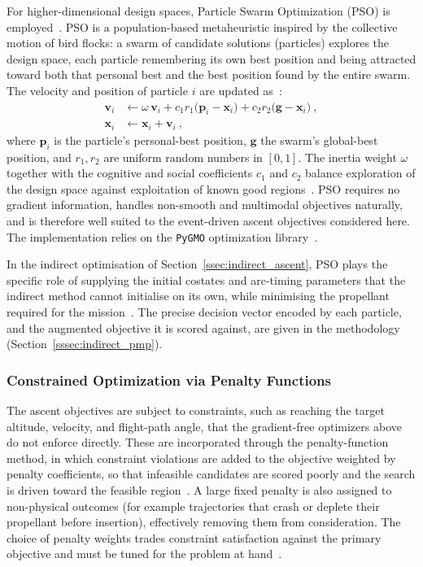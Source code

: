 For higher-dimensional design spaces, Particle Swarm Optimization (PSO) is employed~\cite{kennedy1995particle}. PSO is a population-based metaheuristic inspired by the collective motion of bird flocks: a swarm of candidate solutions (particles) explores the design space, each particle remembering its own best position and being attracted toward both that personal best and the best position found by the entire swarm. The velocity and position of particle $i$ are updated as~\cite{kennedy1995particle, shi1998modified}:
\begin{equation}
\begin{aligned}
\mathbf{v}_i &\leftarrow \omega\,\mathbf{v}_i + c_1 r_1\bigl(\mathbf{p}_i-\mathbf{x}_i\bigr) + c_2 r_2\bigl(\mathbf{g}-\mathbf{x}_i\bigr) \ ,\\
\mathbf{x}_i &\leftarrow \mathbf{x}_i + \mathbf{v}_i \ ,
\end{aligned}
\label{eq:pso_update}
\end{equation}
where $\mathbf{p}_i$ is the particle's personal-best position, $\mathbf{g}$ the swarm's global-best position, and $r_1,r_2$ are uniform random numbers in $[0,1]$. The inertia weight $\omega$ together with the cognitive and social coefficients $c_1$ and $c_2$ balance exploration of the design space against exploitation of known good regions~\cite{shi1998modified}. PSO requires no gradient information, handles non-smooth and multimodal objectives naturally, and is therefore well suited to the event-driven ascent objectives considered here. The implementation relies on the \texttt{PyGMO} optimization library~\cite{biscani2020pagmo}.

In the indirect optimisation of Section~\ref{ssec:indirect_ascent}, PSO plays the specific role of supplying the initial costates and arc-timing parameters that the indirect method cannot initialise on its own, while minimising the propellant required for the mission~\cite{pontani2014particle}. The precise decision vector encoded by each particle, and the augmented objective it is scored against, are given in the methodology (Section~\ref{sssec:indirect_pmp}).


\subsubsection{Constrained Optimization via Penalty Functions}

The ascent objectives are subject to constraints, such as reaching the target altitude, velocity, and flight-path angle, that the gradient-free optimizers above do not enforce directly. These are incorporated through the penalty-function method, in which constraint violations are added to the objective weighted by penalty coefficients, so that infeasible candidates are scored poorly and the search is driven toward the feasible region~\cite{nocedal2006numerical}. A large fixed penalty is also assigned to non-physical outcomes (for example trajectories that crash or deplete their propellant before insertion), effectively removing them from consideration. The choice of penalty weights trades constraint satisfaction against the primary objective and must be tuned for the problem at hand~\cite{nocedal2006numerical}.
